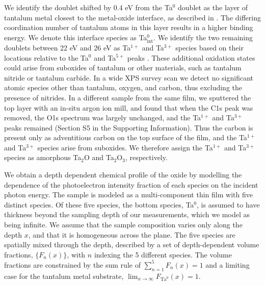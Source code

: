 \documentclass{WileyMSP-template}
\begin{document}
We identify the doublet shifted by 0.4 eV from the Ta$^0$ doublet as the layer of tantalum metal closest to the metal-oxide interface, as described in \cite{Himpsel_core_level_shift:1984}. The differing coordination number of tantalum atoms in this layer results in a higher binding energy. We denote this interface species as Ta$^0_{\text{int}}$. We identify the two remaining doublets between 22 eV and 26 eV as Ta$^{1+}$ and Ta$^{3+}$ species based on their locations relative to the Ta$^0$ and Ta$^{5+}$ peaks \cite{Himpsel_core_level_shift:1984}. These additional oxidation states could arise from suboxides of tantalum or other materials, such as tantalum nitride or tantalum carbide. In a wide XPS survey scan we detect no significant atomic species other than tantalum, oxygen, and carbon, thus excluding the presence of nitrides. In a different sample from the same film, we sputtered the top layer with an in-situ argon ion mill, and found that when the C1s peak was removed, the O1s spectrum was largely unchanged, and the Ta$^{1+}$ and Ta$^{3+}$ peaks remained (Section S5 in the Supporting Information). Thus the carbon is present only as adventitious carbon on the top surface of the film, and the Ta$^{1+}$ and Ta$^{3+}$ species arise from suboxides. We therefore assign the Ta$^{1+}$ and Ta$^{3+}$ species as amorphous Ta$_2$O and Ta$_2$O$_3$, respectively.

We obtain a depth dependent chemical profile of the oxide by modelling the dependence of the photoelectron intensity fraction of each species on the incident photon energy. The sample is modeled as a multi-component thin film with five distinct species. Of these five species, the bottom species, Ta$^0$, is assumed to have thickness beyond the sampling depth of our measurements, which we model as being infinite. We assume that the sample composition varies only along the depth $x$, and that it is homogeneous across the plane. The five species are spatially mixed through the depth, described by a set of depth-dependent volume fractions, $\{F_n(x)\}$, with $n$ indexing the 5 different species. The volume fractions are constrained by the sum rule of $\sum_{n=1}^5 F_n(x) = 1$ and a limiting case for the tantalum metal substrate, $\lim_{x \rightarrow\infty} F_{\text{Ta}^0}(x) = 1$.
\end{document}
